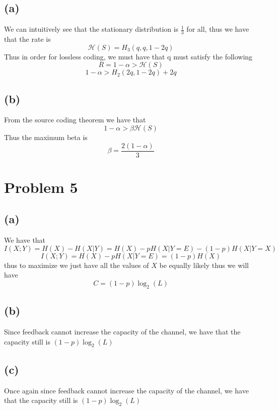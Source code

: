 \subsection*{(a)}
We can intuitively see that the stationary distribution
is $\frac{1}{3}$ for all, thus we have that the rate 
is 
$$\mathcal{H}(S)=H_3(q,q,1-2q)$$
Thus in order for lossless coding, we must have that q must
satisfy the following
$$R=1-\alpha>\mathcal{H}(S)$$
$$\boxed{1-\alpha>H_2(2q,1-2q)+2q}$$
\subsection*{(b)}
From the source coding theorem we have that 
$$1-\alpha>\beta\mathcal{H}(S)$$
Thus the maximum beta is
$$\beta=\boxed{\frac{2(1-\alpha)}{3}}$$
\section*{Problem 5}
\subsection*{(a)}
We have that 
$$I(X;Y)=H(X)-H(X|Y)=H(X)-pH(X|Y=E)-(1-p)H(X|Y=X)$$
$$I(X;Y)=H(X)-pH(X|Y=E)=(1-p)H(X)$$
thus to maximize we just have all the values of $X$ be equally likely
thus we will have
$$\boxed{C=(1-p)\log_2(L)}$$
\subsection*{(b)}
Since feedback cannot increase the capacity of the channel, we have that
the capacity still is $\boxed{(1-p)\log_2(L)}$
\subsection*{(c)}
Once again since feedback cannot increase the capacity of the channel, we have that
the capacity still is $\boxed{(1-p)\log_2(L)}$

